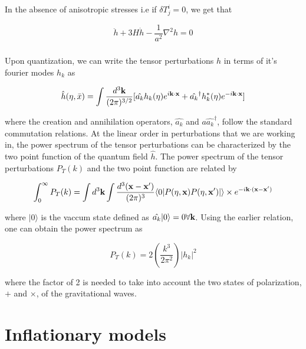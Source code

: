 \documentclass[12pt,a4paper,oneside]{book}
\begin{document}
\noindent In the absence of anisotropic stresses i.e if $\delta T^i_j = 0$, we get that

\begin{equation}
\ddot{h} + 3H\dot{h} - \frac{1}{a^2}\nabla ^2h = 0
\end{equation}

\paragraph*{} Upon quantization, we can write the tensor perturbations $h$ in terms of it's fourier modes $h_k$ as

\begin{equation}
\hat{h}(\eta, \bar{x}) = \int \frac{d^3\bf{k}}{(2\pi)^{3/2}} [\hat{a_k}h_k(\eta)e^{i\bf{k\cdot x}}+ \hat{a_k}^{\dagger}h_k^{*}(\eta)e^{-i\bf{k\cdot x}}] 
\end{equation}

\noindent where the creation and annihilation operators, $\hat{a_k}$ and $a\hat{a_k}^{\dagger}$, follow the standard commutation relations. At the linear order in perturbations that we are working in, the power spectrum of the tensor perturbations can be characterized by the two point function of the quantum field $\hat{h}$. The power spectrum of the tensor perturbations $P_T(k)$ and the two point function are related by

\begin{equation}
\int^{\infty}_0 P_T(k) = \int d^3{\bf{k}}\int\frac{d^3(\bf{x}-\bf{x'})}{(2\pi)^3}\langle 0|P(\eta,{\bf{x}})P(\eta, {\bf{x'}})|\rangle \times e^{-i{\bf{k \cdot (x-x')}}}
\end{equation}

\noindent where $|0\rangle$ is the vaccum state defined as $\hat{a_k}|0\rangle = 0 \forall {\bf{k}}$. Using the earlier relation, one can obtain the power spectrum as

\begin{equation}
P_T(k) = 2 (\frac{k^3}{2\pi^2}) |h_k|^2
\end{equation}


\noindent where the factor of 2 is needed to take into account the two states of polarization, $+$ and $\times$, of the gravitational waves.


\chapter{Inflationary models}
\end{document}
